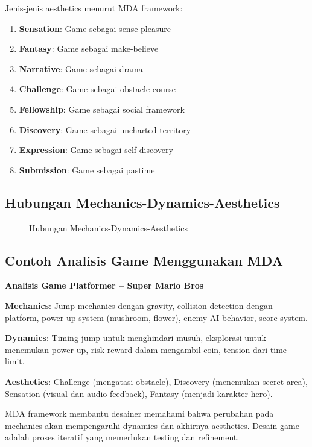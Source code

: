 Jenis-jenis aesthetics menurut MDA framework:
\begin{enumerate}
\item \textbf{Sensation}: Game sebagai sense-pleasure
\item \textbf{Fantasy}: Game sebagai make-believe
\item \textbf{Narrative}: Game sebagai drama
\item \textbf{Challenge}: Game sebagai obstacle course
\item \textbf{Fellowship}: Game sebagai social framework
\item \textbf{Discovery}: Game sebagai uncharted territory
\item \textbf{Expression}: Game sebagai self-discovery
\item \textbf{Submission}: Game sebagai pastime
\end{enumerate}

\subsection{Hubungan Mechanics-Dynamics-Aesthetics}

\begin{figure}[h]
\centering
{}
\caption{Hubungan Mechanics-Dynamics-Aesthetics}
\label{fig:mda_relationship}
\end{figure}

\subsection{Contoh Analisis Game Menggunakan MDA}

\begin{contoh}
\textbf{Analisis Game Platformer -- Super Mario Bros}

\textbf{Mechanics}: Jump mechanics dengan gravity, collision detection dengan platform, power-up system (mushroom, flower), enemy AI behavior, score system.

\textbf{Dynamics}: Timing jump untuk menghindari musuh, eksplorasi untuk menemukan power-up, risk-reward dalam mengambil coin, tension dari time limit.

\textbf{Aesthetics}: Challenge (mengatasi obstacle), Discovery (menemukan secret area), Sensation (visual dan audio feedback), Fantasy (menjadi karakter hero).
\end{contoh}

\begin{catatan}
MDA framework membantu desainer memahami bahwa perubahan pada mechanics akan mempengaruhi dynamics dan akhirnya aesthetics. Desain game adalah proses iteratif yang memerlukan testing dan refinement.
\end{catatan}
